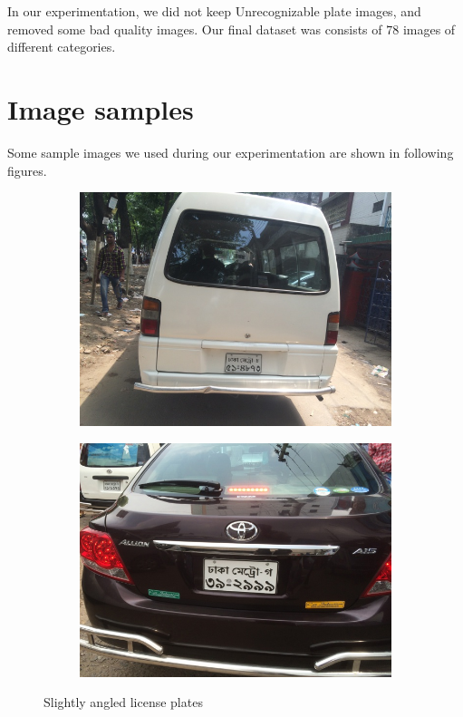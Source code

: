 \documentclass{standalone}
\begin{document}
In our experimentation, we did not keep Unrecognizable plate images, and removed some bad quality images. Our final dataset was consists of $78$ images of different categories.

\section{Image samples}
Some sample images we used during our experimentation are shown in following figures.

\begin{figure}
\begin{subfigure}{0.5\textwidth}
    \centering
    \includegraphics[width=0.9\linewidth]{./img/experiment/stage.1/angle}
\end{subfigure}
\begin{subfigure}{0.5\textwidth}
    \centering
    \includegraphics[width=0.9\linewidth]{./img/experiment/stage.1/angle3}
\end{subfigure}
\caption{Slightly angled license plates}
\end{figure}
\end{document}
